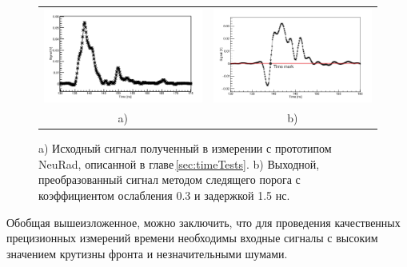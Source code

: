 \begin{figure}[!h]
	\centering
	\begin{tabular}{cc}
		\includegraphics[width=0.5\linewidth]{originalsignalform.png} & \includegraphics[width=0.5\linewidth]{CFDform.png} \\
		a) & b) \\
	\end{tabular}
	\caption{a) Исходный сигнал полученный в измерении с прототипом NeuRad, описанной в главе\,\ref{sec:timeTests}. b) Выходной, преобразованный сигнал методом следящего порога с коэффициентом ослабления 0.3 и задержкой 1.5 нс.}\label{ris:CFDform}
\end{figure}

Обобщая вышеизложенное, можно заключить, что для проведения качественных прецизионных измерений времени необходимы входные сигналы с высоким значением крутизны фронта и незначительными шумами.



